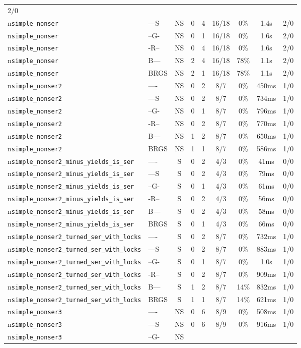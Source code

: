 \begin{tabular}{llccccccc}
2/0 \\n\texttt{simple\_nonser} & ---S & NS & 0 & 4 & 16/18 & 0\% & 1.4s & 2/0 \\n\texttt{simple\_nonser} & --G- & NS & 0 & 1 & 16/18 & 0\% & 1.6s & 2/0 \\n\texttt{simple\_nonser} & -R-- & NS & 0 & 4 & 16/18 & 0\% & 1.6s & 2/0 \\n\texttt{simple\_nonser} & B--- & NS & 2 & 4 & 16/18 & 78\% & 1.1s & 2/0 \\n\texttt{simple\_nonser} & BRGS & NS & 2 & 1 & 16/18 & 78\% & 1.1s & 2/0 \\n\texttt{simple\_nonser2} & ---- & NS & 0 & 2 & 8/7 & 0\% & 450ms & 1/0 \\n\texttt{simple\_nonser2} & ---S & NS & 0 & 2 & 8/7 & 0\% & 734ms & 1/0 \\n\texttt{simple\_nonser2} & --G- & NS & 0 & 1 & 8/7 & 0\% & 796ms & 1/0 \\n\texttt{simple\_nonser2} & -R-- & NS & 0 & 2 & 8/7 & 0\% & 770ms & 1/0 \\n\texttt{simple\_nonser2} & B--- & NS & 1 & 2 & 8/7 & 0\% & 650ms & 1/0 \\n\texttt{simple\_nonser2} & BRGS & NS & 1 & 1 & 8/7 & 0\% & 586ms & 1/0 \\n\texttt{simple\_nonser2\_minus\_yields\_is\_ser} & ---- & S & 0 & 2 & 4/3 & 0\% & 41ms & 0/0 \\n\texttt{simple\_nonser2\_minus\_yields\_is\_ser} & ---S & S & 0 & 2 & 4/3 & 0\% & 79ms & 0/0 \\n\texttt{simple\_nonser2\_minus\_yields\_is\_ser} & --G- & S & 0 & 1 & 4/3 & 0\% & 61ms & 0/0 \\n\texttt{simple\_nonser2\_minus\_yields\_is\_ser} & -R-- & S & 0 & 2 & 4/3 & 0\% & 56ms & 0/0 \\n\texttt{simple\_nonser2\_minus\_yields\_is\_ser} & B--- & S & 0 & 2 & 4/3 & 0\% & 58ms & 0/0 \\n\texttt{simple\_nonser2\_minus\_yields\_is\_ser} & BRGS & S & 0 & 1 & 4/3 & 0\% & 66ms & 0/0 \\n\texttt{simple\_nonser2\_turned\_ser\_with\_locks} & ---- & S & 0 & 2 & 8/7 & 0\% & 732ms & 1/0 \\n\texttt{simple\_nonser2\_turned\_ser\_with\_locks} & ---S & S & 0 & 2 & 8/7 & 0\% & 883ms & 1/0 \\n\texttt{simple\_nonser2\_turned\_ser\_with\_locks} & --G- & S & 0 & 1 & 8/7 & 0\% & 1.0s & 1/0 \\n\texttt{simple\_nonser2\_turned\_ser\_with\_locks} & -R-- & S & 0 & 2 & 8/7 & 0\% & 909ms & 1/0 \\n\texttt{simple\_nonser2\_turned\_ser\_with\_locks} & B--- & S & 1 & 2 & 8/7 & 14\% & 832ms & 1/0 \\n\texttt{simple\_nonser2\_turned\_ser\_with\_locks} & BRGS & S & 1 & 1 & 8/7 & 14\% & 621ms & 1/0 \\n\texttt{simple\_nonser3} & ---- & NS & 0 & 6 & 8/9 & 0\% & 508ms & 1/0 \\n\texttt{simple\_nonser3} & ---S & NS & 0 & 6 & 8/9 & 0\% & 916ms & 1/0 \\n\texttt{simple\_nonser3} & --G- & NS & 
\end{tabular}
